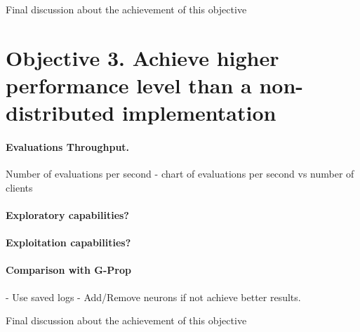 Final discussion about the achievement of this objective



\section{Objective 3. Achieve higher performance level than a non-distributed implementation}

\paragraph*{Evaluations Throughput.} Number of evaluations per second - chart of evaluations per second vs number of clients
\paragraph*{Exploratory capabilities?}
\paragraph*{Exploitation capabilities?}
\paragraph*{Comparison with G-Prop} - Use saved logs - Add/Remove neurons if not achieve better results.

Final discussion about the achievement of this objective